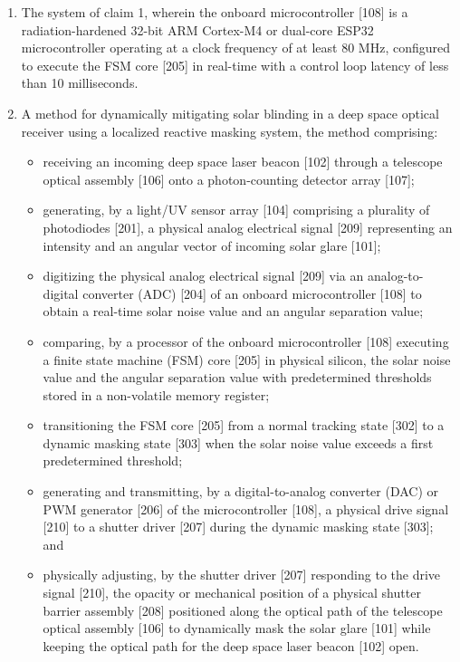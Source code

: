 \documentclass[12pt,a4paper]{article}
\begin{document}
\begin{enumerate}
    \item The system of claim 1, wherein the onboard microcontroller [108] is a radiation-hardened 32-bit ARM Cortex-M4 or dual-core ESP32 microcontroller operating at a clock frequency of at least 80 MHz, configured to execute the FSM core [205] in real-time with a control loop latency of less than 10 milliseconds.

    \item A method for dynamically mitigating solar blinding in a deep space optical receiver using a localized reactive masking system, the method comprising:
    \begin{itemize}
        \item receiving an incoming deep space laser beacon [102] through a telescope optical assembly [106] onto a photon-counting detector array [107];
        \item generating, by a light/UV sensor array [104] comprising a plurality of photodiodes [201], a physical analog electrical signal [209] representing an intensity and an angular vector of incoming solar glare [101];
        \item digitizing the physical analog electrical signal [209] via an analog-to-digital converter (ADC) [204] of an onboard microcontroller [108] to obtain a real-time solar noise value and an angular separation value;
        \item comparing, by a processor of the onboard microcontroller [108] executing a finite state machine (FSM) core [205] in physical silicon, the solar noise value and the angular separation value with predetermined thresholds stored in a non-volatile memory register;
        \item transitioning the FSM core [205] from a normal tracking state [302] to a dynamic masking state [303] when the solar noise value exceeds a first predetermined threshold;
        \item generating and transmitting, by a digital-to-analog converter (DAC) or PWM generator [206] of the microcontroller [108], a physical drive signal [210] to a shutter driver [207] during the dynamic masking state [303]; and
        \item physically adjusting, by the shutter driver [207] responding to the drive signal [210], the opacity or mechanical position of a physical shutter barrier assembly [208] positioned along the optical path of the telescope optical assembly [106] to dynamically mask the solar glare [101] while keeping the optical path for the deep space laser beacon [102] open.
    \end{itemize}


\end{enumerate}
\end{document}
